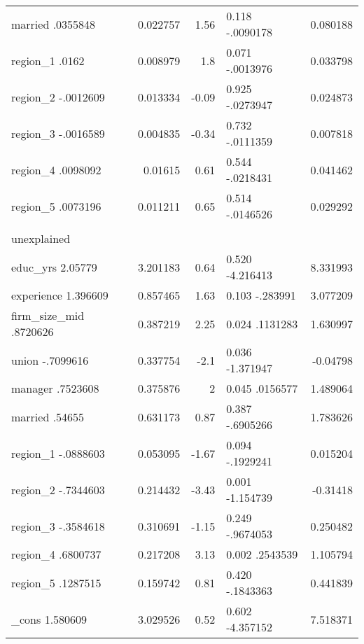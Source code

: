 \begin{table}[htbp]
\begin{tabular}{lrrlr}
    married    .0355848 & 0.022757 & 1.56  & 0.118    -.0090178 & 0.080188 \\
    region\_1       .0162 & 0.008979 & 1.8   & 0.071    -.0013976 & 0.033798 \\
    region\_2   -.0012609 & 0.013334 & -0.09 & 0.925    -.0273947 & 0.024873 \\
    region\_3   -.0016589 & 0.004835 & -0.34 & 0.732    -.0111359 & 0.007818 \\
    region\_4    .0098092 & 0.01615 & 0.61  & 0.544    -.0218431 & 0.041462 \\
    region\_5    .0073196 & 0.011211 & 0.65  & 0.514    -.0146526 & 0.029292 \\
          &       &       &       &  \\
    unexplained    &       &       &       &  \\
    educ\_yrs     2.05779 & 3.201183 & 0.64  & 0.520    -4.216413 & 8.331993 \\
    experience    1.396609 & 0.857465 & 1.63  & 0.103     -.283991 & 3.077209 \\
    firm\_size\_mid    .8720626 & 0.387219 & 2.25  & 0.024     .1131283 & 1.630997 \\
    union   -.7099616 & 0.337754 & -2.1  & 0.036    -1.371947 & -0.04798 \\
    manager    .7523608 & 0.375876 & 2     & 0.045     .0156577 & 1.489064 \\
    married      .54655 & 0.631173 & 0.87  & 0.387    -.6905266 & 1.783626 \\
    region\_1   -.0888603 & 0.053095 & -1.67 & 0.094    -.1929241 & 0.015204 \\
    region\_2   -.7344603 & 0.214432 & -3.43 & 0.001    -1.154739 & -0.31418 \\
    region\_3   -.3584618 & 0.310691 & -1.15 & 0.249    -.9674053 & 0.250482 \\
    region\_4    .6800737 & 0.217208 & 3.13  & 0.002     .2543539 & 1.105794 \\
    region\_5    .1287515 & 0.159742 & 0.81  & 0.420    -.1843363 & 0.441839 \\
    \_cons    1.580609 & 3.029526 & 0.52  & 0.602    -4.357152 & 7.518371 \\
    \end{tabular}%
  \label{tab:addlabel}%
\end{table}%

